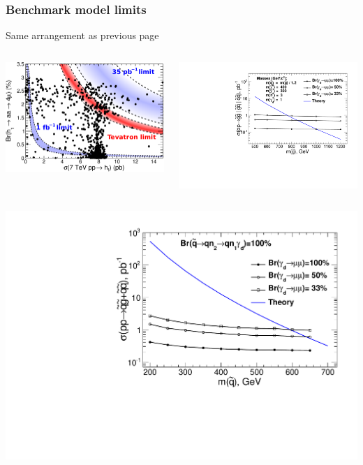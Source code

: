 \documentclass[compress]{beamer}
\begin{document}
\begin{frame}
\frametitle{Benchmark model limits}
Same arrangement as previous page

\begin{columns}
\includegraphics[width=\linewidth]{limits_on_models_7tev.pdf}

\includegraphics[width=\linewidth]{ulimit_model_u1.pdf}
\end{columns}

\begin{columns}
\includegraphics[width=\linewidth]{ulimit_model0.pdf}


\end{columns}
\end{frame}
\end{document}
